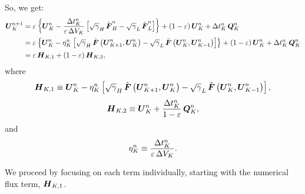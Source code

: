 \documentclass[10pt,preprint]{aastex}
\begin{document}
So, we get:
\begin{align}
    \boldsymbol{U}^{n+1}_{K}&=\varepsilon\left\{\boldsymbol{U}^{n}_{K}-\frac{\Delta t^{n}_{K}}{\varepsilon\,\Delta V_{K}}\left[\sqrt{\gamma}_{H}\,\hat{\boldsymbol{F}}^{n}_{H}-\sqrt{\gamma}_{L}\,\hat{\boldsymbol{F}}^{n}_{L}\right]\right\}+\left(1-\varepsilon\right)\boldsymbol{U}^{n}_{K}+\Delta t^{n}_{K}\,\boldsymbol{Q}^{n}_{K}\\
    &=\varepsilon\left\{\boldsymbol{U}^{n}_{K}-\eta^{n}_{K}\left[\sqrt{\gamma}_{H}\,\hat{\boldsymbol{F}}\left(\boldsymbol{U}^{n}_{K+1},\boldsymbol{U}^{n}_{K}\right)-\sqrt{\gamma}_{L}\,\hat{\boldsymbol{F}}\left(\boldsymbol{U}^{n}_{K},\boldsymbol{U}^{n}_{K-1}\right)\right]\right\}+\left(1-\varepsilon\right)\boldsymbol{U}^{n}_{K}+\Delta t^{n}_{K}\,\boldsymbol{Q}^{n}_{K}\\
    &=\varepsilon\,\boldsymbol{H}_{K,1}+\left(1-\varepsilon\right)\boldsymbol{H}_{K,2},
\end{align}
where
\begin{equation}
    \boldsymbol{H}_{K,1}\equiv \boldsymbol{U}^{n}_{K}-\eta^{n}_{K}\left[\sqrt{\gamma}_{H}\,\hat{\boldsymbol{F}}\left(\boldsymbol{U}^{n}_{K+1},\boldsymbol{U}^{n}_{K}\right)-\sqrt{\gamma}_{L}\,\hat{\boldsymbol{F}}\left(\boldsymbol{U}^{n}_{K},\boldsymbol{U}^{n}_{K-1}\right)\right],
\end{equation}
\begin{equation}
    \boldsymbol{H}_{K,2}\equiv\boldsymbol{U}^{n}_{K}+\frac{\Delta t^{n}_{K}}{1-\varepsilon}\,\boldsymbol{Q}^{n}_{K},
\end{equation}
and
\begin{equation}
    \eta^{n}_{K}\equiv\frac{\Delta t^{n}_{K}}{\varepsilon\,\Delta V_{K}}.
\end{equation}

We proceed by focusing on each term individually, starting with the numerical flux term, $\boldsymbol{H}_{K,1}$.
\end{document}
